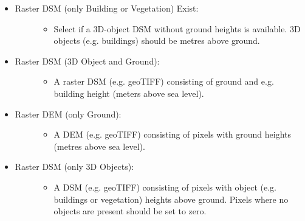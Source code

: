 \documentclass[letterpaper,10pt,english]{sphinxmanual}
\begin{document}
\begin{itemize}
\begin{description}
\begin{itemize}
\end{itemize}

\end{description}

\item {} \begin{description}
\item[{Raster DSM (only Building or Vegetation) Exist:}] \leavevmode\begin{itemize}
\item {} 
Select if a 3D-object DSM without ground heights is available. 3D objects (e.g. buildings) should be metres above ground.

\end{itemize}

\end{description}

\item {} \begin{description}
\item[{Raster DSM (3D Object and Ground):}] \leavevmode\begin{itemize}
\item {} 
A raster DSM (e.g. geoTIFF) consisting of ground and e.g. building height (meters above sea level).

\end{itemize}

\end{description}

\item {} \begin{description}
\item[{Raster DEM (only Ground):}] \leavevmode\begin{itemize}
\item {} 
A DEM (e.g. geoTIFF) consisting of pixels with ground heights (metres above sea level).

\end{itemize}

\end{description}

\item {} \begin{description}
\item[{Raster DSM (only 3D Objects):}] \leavevmode\begin{itemize}
\item {} 
A DSM (e.g. geoTIFF) consisting of pixels with object (e.g. buildings or vegetation) heights above ground. Pixels where no objects are present should be set to zero.


\end{itemize}
\end{description}
\end{itemize}
\end{document}
